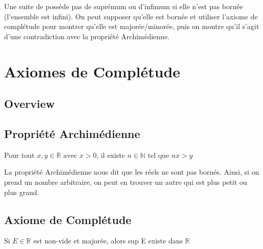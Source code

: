 \documentclass{article}
\begin{document}
\begin{problem}
    Une suite de possède pas de suprémum ou d'infimum si elle n'est pas bornée
    (l'ensemble est infini). On peut supposer qu'elle est bornée et utiliser
    l'axiome de complétude pour montrer qu'elle est majorée/minorée, puis on
    montre qu'il s'agit d'une contradiction avec la propriété Archimédienne.
\end{problem}

\begin{problem}
\end{problem}

\pagebreak
\section{Axiomes de Complétude}
\subsection{Overview}

\subsection{Propriété Archimédienne}

\begin{theorem}
    Pour tout $x,y \in \mathbb{R} \text{ avec } x>0$, il existe $ n \in \mathbb{N}
    \text{ tel que } nx>y$
\end{theorem}

\begin{remark}
    La propriété Archimédienne nous dit que les réels ne sont pas bornés. Ainsi,
    si on prend un nombre arbitraire, on peut en trouver un autre qui est plus
    petit ou plus grand.
\end{remark}

\subsection{Axiome de Complétude}

\begin{proposition}
    Si $E \in \mathbb{R}$ est non-vide et majorée, alors sup E existe dans
    $\mathbb{R}$
\end{proposition}
\end{document}
